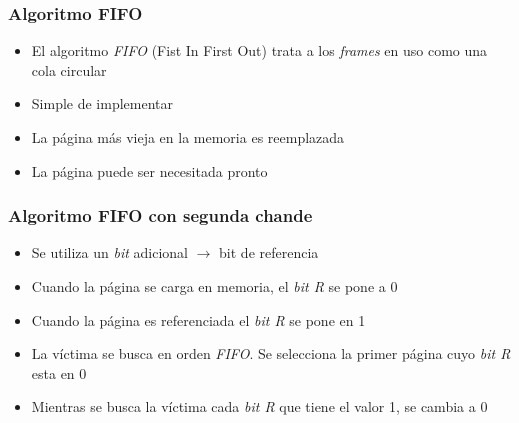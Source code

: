\begin{frame}
  \frametitle{Algoritmo \textbf{FIFO}}
  \begin{itemize}
  	\item El algoritmo \emph{FIFO} (Fist In First Out) trata a los \emph{frames} en uso como una cola circular
	\item Simple de implementar
	\item La página más vieja en la memoria es reemplazada
	\item La página puede ser necesitada pronto
  \end{itemize}
  \begin{table}
	  \centering
  \end{table}
\end{frame}

\begin{frame}
  \frametitle{Algoritmo \textbf{FIFO con segunda chande}}
  \begin{itemize}
  	\item Se utiliza un \emph{bit} adicional $\rightarrow$ bit de referencia
	\item Cuando la página se carga en memoria, el \emph{bit R} se pone a 0
	\item Cuando la página es referenciada el \emph{bit R} se pone en 1
	\item La víctima se busca en orden \emph{FIFO}. Se selecciona la primer página cuyo \emph{bit R} esta en 0
	\item Mientras se busca la víctima cada \emph{bit R} que tiene el valor 1, se cambia a 0
  \end{itemize}  
\end{frame}

